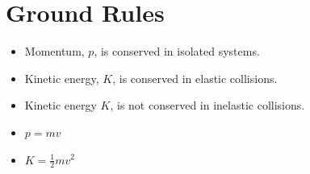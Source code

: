 
\section{Ground Rules}
\begin{itemize}
    \item Momentum, $p$, is conserved in isolated systems.
    \item Kinetic energy, $K$, is conserved in elastic collisions.
    \item Kinetic energy $K$, is not conserved in inelastic collisions.
    \item $p = mv$
    \item $K = \tfrac{1}{2}mv^2$
\end{itemize}
